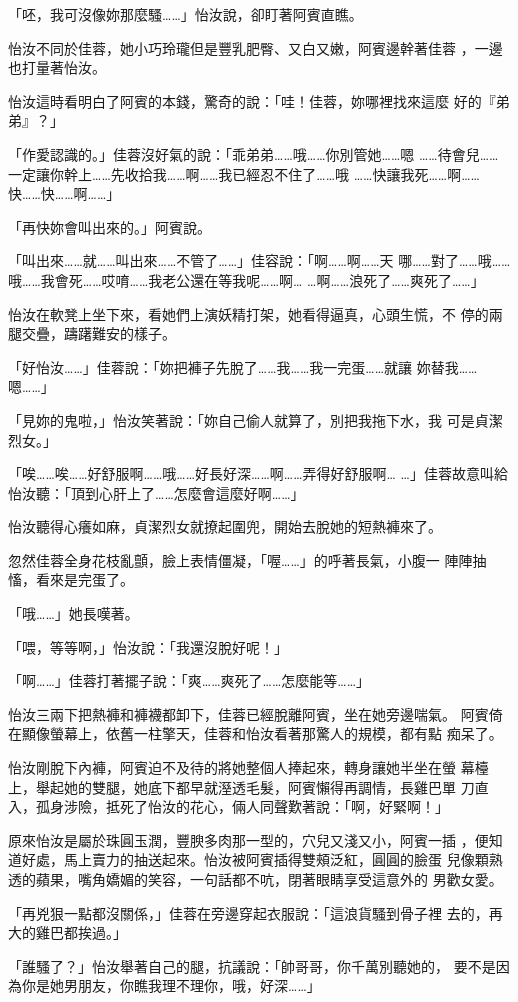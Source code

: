「呸，我可沒像妳那麼騷……」怡汝說，卻盯著阿賓直瞧。

怡汝不同於佳蓉，她小巧玲瓏但是豐乳肥臀、又白又嫩，阿賓邊幹著佳蓉
，一邊也打量著怡汝。

怡汝這時看明白了阿賓的本錢，驚奇的說：「哇！佳蓉，妳哪裡找來這麼
好的『弟弟』？」

「作愛認識的。」佳蓉沒好氣的說：「乖弟弟……哦……你別管她……嗯
……待會兒……一定讓你幹上……先收拾我……啊……我已經忍不住了……哦
……快讓我死……啊……快……快……啊……」

「再快妳會叫出來的。」阿賓說。

「叫出來……就……叫出來……不管了……」佳容說：「啊……啊……天
哪……對了……哦……哦……我會死……哎唷……我老公還在等我呢……啊…
…啊……浪死了……爽死了……」

怡汝在軟凳上坐下來，看她們上演妖精打架，她看得逼真，心頭生慌，不
停的兩腿交疊，躊躇難安的樣子。

「好怡汝……」佳蓉說：「妳把褲子先脫了……我……我一完蛋……就讓
妳替我……嗯……」

「見妳的鬼啦，」怡汝笑著說：「妳自己偷人就算了，別把我拖下水，我
可是貞潔烈女。」

「唉……唉……好舒服啊……哦……好長好深……啊……弄得好舒服啊…
…」佳蓉故意叫給怡汝聽：「頂到心肝上了……怎麼會這麼好啊……」

怡汝聽得心癢如麻，貞潔烈女就撩起圍兜，開始去脫她的短熱褲來了。

忽然佳蓉全身花枝亂顫，臉上表情僵凝，「喔……」的呼著長氣，小腹一
陣陣抽慉，看來是完蛋了。

「哦……」她長嘆著。

「喂，等等啊，」怡汝說：「我還沒脫好呢！」

「啊……」佳蓉打著擺子說：「爽……爽死了……怎麼能等……」

怡汝三兩下把熱褲和褲襪都卸下，佳蓉已經脫離阿賓，坐在她旁邊喘氣。
阿賓倚在顯像螢幕上，依舊一柱擎天，佳蓉和怡汝看著那驚人的規模，都有點
痴呆了。

怡汝剛脫下內褲，阿賓迫不及待的將她整個人捧起來，轉身讓她半坐在螢
幕檯上，舉起她的雙腿，她底下都早就溼透毛髮，阿賓懶得再調情，長雞巴單
刀直入，孤身涉險，抵死了怡汝的花心，倆人同聲歎著說：「啊，好緊啊！」

原來怡汝是屬於珠圓玉潤，豐腴多肉那一型的，穴兒又淺又小，阿賓一插
，便知道好處，馬上賣力的抽送起來。怡汝被阿賓插得雙頰泛紅，圓圓的臉蛋
兒像顆熟透的蘋果，嘴角嬌媚的笑容，一句話都不吭，閉著眼睛享受這意外的
男歡女愛。

「再兇狠一點都沒關係，」佳蓉在旁邊穿起衣服說：「這浪貨騷到骨子裡
去的，再大的雞巴都挨過。」

「誰騷了？」怡汝舉著自己的腿，抗議說：「帥哥哥，你千萬別聽她的，
要不是因為你是她男朋友，你瞧我理不理你，哦，好深……」

